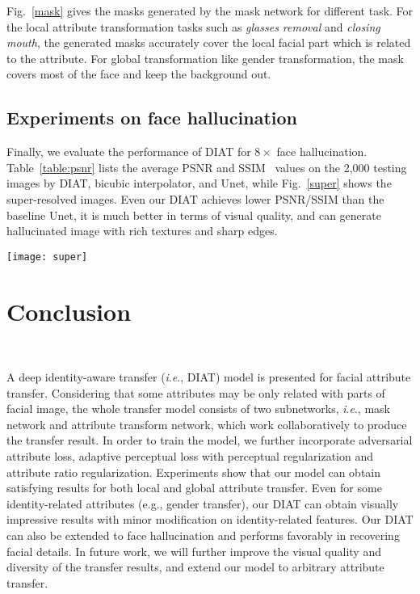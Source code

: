 \documentclass[journal]{IEEEtran}
\newcommand{\ie}{\textit{i}.\textit{e}.}
\begin{document}
Fig.~\ref{mask} gives the masks generated by the mask network for different task. For the local attribute transformation tasks such as \textit{glasses removal} and \textit{closing mouth}, the generated masks accurately cover the local facial part which is related to the attribute. For global transformation like gender transformation, the mask covers most of the face and keep the background out.

\subsection{Experiments on face hallucination}

Finally, we evaluate the performance of DIAT for $8\times$ face hallucination.
Table~\ref{table:psnr} lists the average PSNR and SSIM~\cite{wang2003ssim} values on the 2,000 testing images by DIAT, bicubic interpolator, and Unet, while Fig.~\ref{super} shows the super-resolved images.
Even our DIAT achieves lower PSNR/SSIM than the baseline Unet, it is much better in terms of visual quality, and can generate hallucinated image with rich textures and sharp edges.

\begin{figure*}
\begin{center}
\texttt{[image: super]}
\end{center}
   \caption{Results of face hallucination by different methods.}
\label{super}
\end{figure*}







\section{Conclusion}
~\label{sec:conclusion}

A deep identity-aware transfer (\ie, DIAT) model is presented for facial attribute transfer.
Considering that some attributes may be only related with parts of facial image, the whole transfer model consists of two subnetworks, \ie, mask network and attribute transform network, which work collaboratively to produce the transfer result.
In order to train the model, we further incorporate adversarial attribute loss, adaptive perceptual loss with perceptual regularization and attribute ratio regularization.
Experiments show that our model can obtain satisfying results for both local and global attribute transfer.
Even for some identity-related attributes (e.g., gender transfer), our DIAT can obtain visually impressive results with minor modification on identity-related features.
Our DIAT can also be extended to face hallucination and performs favorably in recovering facial details.
In future work, we will further improve the visual quality and diversity of the transfer results, and extend our model to arbitrary attribute transfer.













\ifCLASSOPTIONcaptionsoff
  \newpage
\fi











\end{document}
